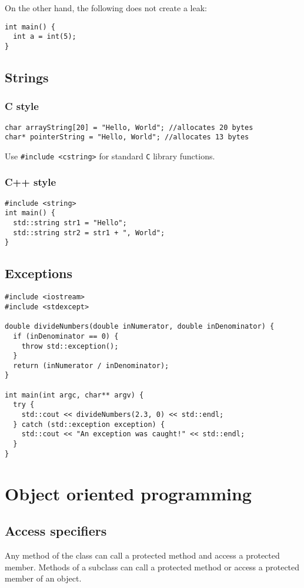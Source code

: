 \documentclass[a4paper,12pt,oneside]{book}
\begin{document}
On the other hand, the following does not create a leak:
\begin{lstlisting}[caption={No memory leak}]
int main() {
  int a = int(5);
}
\end{lstlisting}

\section{Strings}
\subsection{C style}
\begin{lstlisting}
char arrayString[20] = "Hello, World"; //allocates 20 bytes
char* pointerString = "Hello, World"; //allocates 13 bytes
\end{lstlisting}

Use \lstinline|#include <cstring>| for standard \verb|C| library functions.
\subsection{C++ style}
\begin{lstlisting}
#include <string>
int main() {
  std::string str1 = "Hello";
  std::string str2 = str1 + ", World";
}
\end{lstlisting}
\section{Exceptions}
\begin{lstlisting}
#include <iostream>
#include <stdexcept>

double divideNumbers(double inNumerator, double inDenominator) {
  if (inDenominator == 0) {
    throw std::exception();
  }
  return (inNumerator / inDenominator);
}

int main(int argc, char** argv) {
  try {
    std::cout << divideNumbers(2.3, 0) << std::endl;
  } catch (std::exception exception) {
    std::cout << "An exception was caught!" << std::endl;
  }
}
\end{lstlisting}

\chapter{Object oriented programming}
\section{Access specifiers}
Any method of the class can call a protected method and access a protected member. Methods of a subclass can call a protected method or access a protected member of an object.
\end{document}

